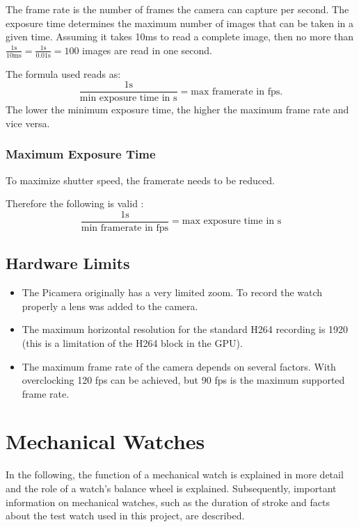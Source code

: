 \documentclass[12pt, a4paper]{report}
\begin{document}
    The frame rate is the number of frames the camera can capture per second. The exposure time determines the maximum number of images that can be taken in a given time. Assuming it takes 10ms to read a complete image, then no more than $\frac{1 \text{s} }{10 \text{ms}} = \frac{1\text{s}}{0.01\text{s}} = 100 $ images are read in one second. 
    
    \bigskip
    
    The formula used reads as: 
    \begin{displaymath}
    \frac{1\text{s}}{\text{min exposure time in s}} = \text{max framerate in
    fps.} 
    \end{displaymath}
    The lower the minimum exposure time, the higher the maximum frame rate and vice versa.
    
    \subsubsection{Maximum Exposure Time}
    To maximize shutter speed, the framerate needs to be reduced. 
       \newline
      
        \bigskip
    Therefore the following is valid :
    \begin{displaymath}
    \frac{1\text{s}}{\text{min framerate in fps}} = \text{max exposure time
    in s}
    \end{displaymath} 
    
    \subsection{Hardware Limits}
    
    \begin{itemize}
    \item The Picamera originally has a very limited zoom. To record the watch properly a lens was added to the camera.
    \item The maximum horizontal resolution for the standard H264 recording is 1920 (this is a limitation of the H264 block in the GPU).
    \item The maximum frame rate of the camera depends on several factors. With overclocking 120 fps can be achieved, but 90 fps is the maximum supported frame rate.
    
    \end{itemize}
    
    \section{Mechanical Watches}  
    In the following, the function of a mechanical watch is explained in more detail and the role of a watch's balance wheel is explained. Subsequently, important information on mechanical watches, such as the duration of stroke and facts about the test watch used in this project, are described.
\end{document}
